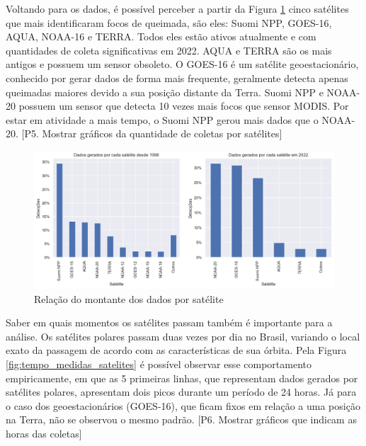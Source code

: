 \documentclass[cic,tc]{iiufrgs}
\begin{document}
Voltando para os dados, é possível perceber a partir da Figura
\ref{fig:porcentagem_satelites} cinco satélites que mais identificaram  
focos de queimada, são eles: Suomi NPP, GOES-16, AQUA, NOAA-16 e TERRA. 
Todos eles estão 
ativos atualmente e com quantidades de coleta significativas em 2022. AQUA e TERRA 
são os mais antigos e possuem um sensor obsoleto. O GOES-16 é um satélite
geoestacionário, conhecido por gerar dados de forma mais frequente, geralmente 
detecta apenas queimadas maiores devido a sua posição distante da Terra. Suomi NPP e
NOAA-20 possuem um sensor que detecta 10 vezes mais focos que sensor MODIS. Por 
estar em atividade a mais tempo, o Suomi NPP gerou mais dados que o NOAA-20.
[P5. Mostrar gráficos da quantidade de coletas por satélites] \par

\begin{figure}
    \caption{Relação do montante dos dados por satélite}
    \begin{center}
        \includegraphics[width=35em]{porcentagem_satelites}
    \end{center}
    \label{fig:porcentagem_satelites}
\end{figure}

Saber em quais momentos os satélites passam também é importante para a análise. 
Os satélites polares passam duas vezes por dia no Brasil, variando o local 
exato da passagem de acordo com as características de sua órbita. Pela  
Figura \ref{fig:tempo_medidas_satelites} é possível observar esse comportamento 
empiricamente, em que as 5 primeiras linhas, que representam dados gerados por 
satélites polares, apresentam dois picos durante um período de 24 horas. Já para o  
caso dos geoestacionários (GOES-16), que ficam fixos em relação a uma posição 
na Terra, não se observou o mesmo padrão. 
[P6. Mostrar gráficos que indicam as horas das coletas] \par
\end{document}
